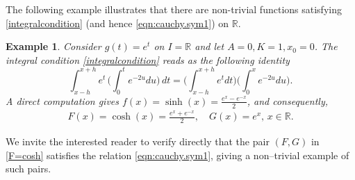 \documentclass{birkjour}
\newtheorem{example}[theorem]{Example}
\begin{document}
The following example illustrates that there are non-trivial functions satisfying \eqref{integralcondition} (and hence \eqref{eqn:cauchy.sym1}) on ${{\mathbb R}}$. 
\begin{example}
Consider $g(t)= e^t$ on $I={{\mathbb R}}$ and let $A=0, K=1, x_0=0$. The integral condition \eqref{integralcondition} reads as the following identity
\begin{equation*}
\int_{x-h}^{x+h} e^t \, \Bigg(\int_{0}^te^{-2u} du\Bigg) \,dt= \Bigg(\int_{x-h}^{x+h}e^t dt\Bigg)\Bigg(\int_{0}^x e^{-2u}du\Bigg).
\end{equation*}
A direct computation gives $f(x) = \sinh(x)=\frac{e^x-e^{-x}}{2}$, and consequently,
\begin{align}\label{F=cosh}
F(x) = \cosh(x) = \frac{e^x+e^{-x}}{2}, \quad G(x) = e^x, \, x\in{{\mathbb R}}.
\end{align}
\end{example} 

We invite the interested reader to verify directly that the pair $(F,G)$ in \eqref{F=cosh} satisfies the relation \eqref{eqn:cauchy.sym1},  giving a non--trivial example of such pairs. 
\end{document}
